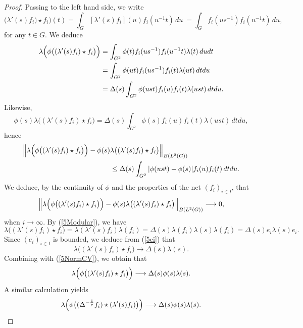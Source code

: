 \documentclass[12pt]{amsart}
\newcommand{\Bignorm}[1]{\Bigl\Vert#1\Bigr\Vert}
\theoremstyle{remark}
\theoremstyle{definition}
\numberwithin{equation}{section}
\begin{document}
\begin{proof}
Passing to the left hand side, we write
$$
\bigl(\lambda'(s)f_i) \star f_i\bigr)(t)  = \int_G [\lambda'(s) f_i](u) f_i(u^{-1}t) \, du
\ = \int_G f_i(us^{-1}) f_i(u^{-1}t) \, du,
$$
for any $t\in G$. We deduce
\begin{align*}
\lambda\Bigl(\phi\bigl((\lambda'(s)f_i) \star 
f_i\bigr)\Bigr) & =
\int_{G^2}\phi(t) f_i(us^{-1}) f_i(u^{-1}t) \lambda(t)\, dudt\\
& = \int_{G^2}\phi(ut) f_i(us^{-1}) f_i(t) \lambda(ut)\, dtdu\\
& = \Delta(s) \int_{G^2}\phi(ust) f_i(u) f_i(t) \lambda(ust)\, dtdu.
\end{align*}
Likewise,
$$
\phi(s)\lambda\bigl((\lambda'(s)f_i) \star 
f_i\bigr) =
\Delta(s) \int_{G^2}\phi(s) f_i(u) f_i(t) \lambda(ust)\, dtdu,
$$
hence
\begin{align*}
\Bignorm{\lambda\Bigl(\phi\bigl((\lambda'(s)f_i)\star 
f_i\bigr)\Bigr) -\phi(s)& \lambda\bigl((\lambda'(s)f_i)\star 
f_i\bigr)}_{B(L^2(G))}\\
&\leq \Delta(s)
\int_{G^2}\vert\phi(ust)-\phi(s)\vert
f_i(u)f_i(t)\, dtdu.
\end{align*}
We deduce, by the continuity of $\phi$ and the properties of the net $(f_i)_{i\in I}$, that
\begin{equation}\label{5NormCV}
\Bignorm{\lambda\Bigl(\phi\bigl((\lambda'(s)f_i)\star 
f_i\bigr)\Bigr) -\phi(s)\lambda\bigl((\lambda'(s)f_i)\star 
f_i\bigr)}_{B(L^2(G))}\longrightarrow 0,
\end{equation}
when $i\to\infty$. 
By (\ref{5Modular}), we have
$$
\lambda\bigl((\lambda'(s)f_i)\star 
f_i\bigr)  = \lambda(\lambda'(s)f_i)\lambda(f_i)
= \Delta(s) \lambda(f_i)\lambda(s)\lambda(f_i)=\Delta(s) e_i\lambda(s)e_i.
$$
Since $(e_i)_{i\in I}$ is bounded, we deduce from (\ref{5ei}) that 
$$
\lambda\bigl((\lambda'(s)f_i)\star 
f_i\bigr)  \longrightarrow \Delta(s)\lambda(s).
$$
Combining with  (\ref{5NormCV}), we obtain that
$$
\lambda\Bigl(\phi\bigl((\lambda'(s)f_i)\star 
f_i\bigr)\Bigr)\longrightarrow \Delta(s)\phi(s)\lambda(s).
$$
A similar calculation yields
$$
\lambda\Bigl(\phi\bigl((\Delta^{-\frac{1}{p}}
f_i)\star (\lambda'(s)f_i)\bigr)\Bigr)\longrightarrow \Delta(s)\phi(s)\lambda(s).
$$


\end{proof}
\end{document}
